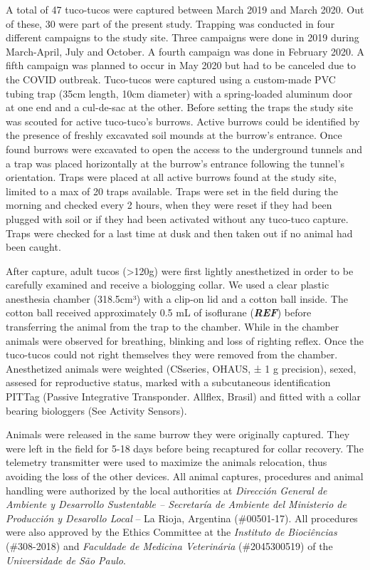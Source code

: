 \documentclass[english,msc,numbers,hidelinks]{coppe}
\begin{document}
  A total of 47 tuco-tucos were captured between March 2019 and March 2020. Out of these, 30 were part of the present study. Trapping was conducted in four different campaigns to the study site. Three campaigns were done in 2019 during March-April, July and October. A fourth campaign was done in February 2020. A fifth campaign was planned to occur in May 2020 but had to be canceled due to the COVID outbreak. Tuco-tucos were captured using a custom-made PVC tubing trap (35cm length, 10cm diameter) with a spring-loaded aluminum door at one end and a cul-de-sac at the other. Before setting the traps the study site was scouted for active tuco-tuco's burrows. Active burrows could be identified by the presence of freshly excavated soil mounds at the burrow's entrance. Once found burrows were excavated to open the access to the underground tunnels and a trap was placed horizontally at the burrow's entrance following the tunnel's orientation. Traps were placed at all active burrows found at the study site, limited to a max of 20 traps available. Traps were set in the field during the morning and checked every 2 hours, when they were reset if they had been plugged with soil or if they had been activated without any tuco-tuco capture. Traps were checked for a last time at dusk and then taken out if no animal had been caught.

  After capture, adult tucos (\textgreater120g) were first lightly anesthetized in order to be carefully examined and receive a biologging collar. We used a clear plastic anesthesia chamber (318.5cm³) with a clip-on lid and a cotton ball inside. The cotton ball received approximately 0.5 mL of isoflurane (\textbf{\emph{REF}}) before transferring the animal from the trap to the chamber. While in the chamber animals were observed for breathing, blinking and loss of righting reflex. Once the tuco-tucos could not right themselves they were removed from the chamber. Anesthetized animals were weighted (CSseries, OHAUS, ± 1 g precision), sexed, assesed for reproductive status, marked with a subcutaneous identification PITTag (Passive Integrative Transponder. Allflex, Brasil) and fitted with a collar bearing biologgers (See Activity Sensors).

  Animals were released in the same burrow they were originally captured. They were left in the field for 5-18 days before being recaptured for collar recovery. The telemetry transmitter were used to maximize the animals relocation, thus avoiding the loss of the other devices. All animal captures, procedures and animal handling were authorized by the local authorities at \emph{Dirección General de Ambiente y Desarrollo Sustentable -- Secretaría de Ambiente del Ministerio de Producción y Desarollo Local} -- La Rioja, Argentina (\#00501-17). All procedures were also approved by the Ethics Committee at the \emph{Instituto de Biociências} (\#308-2018) and \emph{Faculdade de Medicina Veterinária} (\#2045300519) of the \emph{Universidade de São Paulo}.
\end{document}
